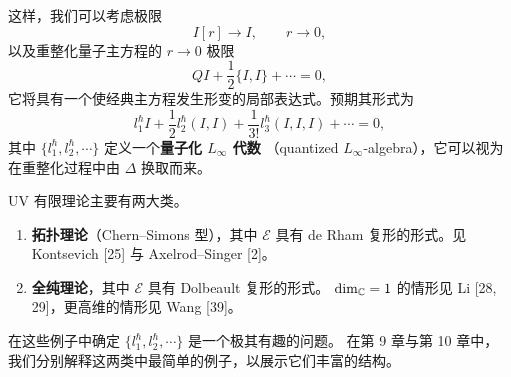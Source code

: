 这样，我们可以考虑极限
\[
  I[r]\to I,\qquad r\to0,
\]
以及重整化量子主方程的 $r\to0$ 极限
\[
  QI+\frac{1}{2}\{I,I\}+\cdots=0,
\]
它将具有一个使经典主方程发生形变的局部表达式。预期其形式为
\[
  l^{\hbar}_1I+\frac{1}{2}l^{\hbar}_2(I,I)+\frac{1}{3!}l^{\hbar}_3(I,I,I)
  +\cdots=0,
\]
其中 $\{l^{\hbar}_1,l^{\hbar}_2,\cdots\}$ 定义一个\textbf{量子化 $L_{\infty}$ 代数}
（quantized $L_\infty$-algebra），它可以视为在重整化过程中由 $\Delta$ 换取而来。

UV 有限理论主要有两大类。
\begin{enumerate}[label=\textcircled{\small\arabic*},leftmargin=2.4em,itemsep=0.25em]
  \item \textbf{拓扑理论}（Chern--Simons 型），其中 $\mathcal{E}$ 具有 de Rham
        复形的形式。见 Kontsevich \textup{[25]} 与 Axelrod--Singer \textup{[2]}。
  \item \textbf{全纯理论}，其中 $\mathcal{E}$ 具有 Dolbeault 复形的形式。
        $\dim_{\mathbb{C}}=1$ 的情形见 Li \textup{[28, 29]}，更高维的情形见 Wang \textup{[39]}。
\end{enumerate}

在这些例子中确定 $\{l^{\hbar}_1,l^{\hbar}_2,\cdots\}$ 是一个极其有趣的问题。
在第 9 章与第 10 章中，我们分别解释这两类中最简单的例子，以展示它们丰富的结构。

